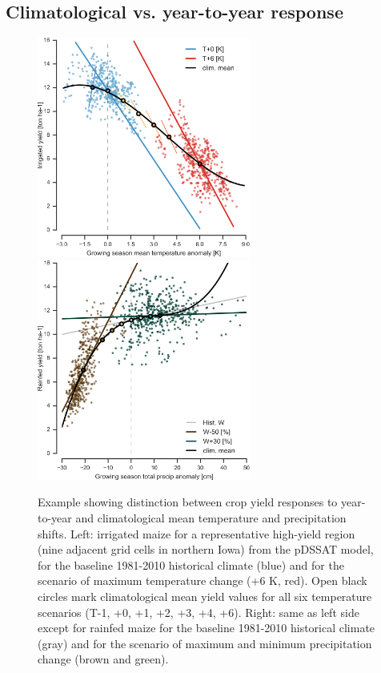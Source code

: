 \documentclass[gmd, manuscript]{copernicus} %
\begin{document}
\subsection{Climatological vs. year-to-year response}
\begin{figure}[ht]
\centering
   \includegraphics[width=7cm]{figures/tempyearvclim.png} \hspace{10mm} \includegraphics[width=7cm]{figures/pryearvclim.png}
   \caption{
   Example showing distinction between crop yield responses to year-to-year and climatological mean temperature and precipitation shifts.
   Left: irrigated maize for a representative high-yield region (nine adjacent grid cells in northern Iowa) from the pDSSAT model, for the baseline 1981-2010 historical climate (blue) and for the scenario of maximum temperature change (+6 K, red). 
   Open black circles mark climatological mean yield values for all six temperature scenarios (T-1, +0, +1, +2, +3, +4, +6).
   Right: same as left side except for rainfed maize for the baseline 1981-2010 historical climate (gray) and for the scenario of maximum and minimum precipitation change (brown and green).
}
\end{figure}
\end{document}
